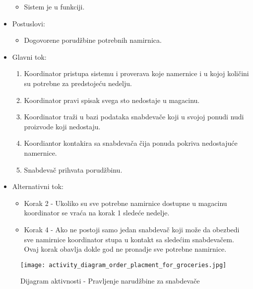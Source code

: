 \begin{itemize}
\begin{itemize}
		    \item Sistem je u funkciji.
		\end{itemize}
	\item Postuslovi:
		\begin{itemize}
			\item Dogovorene porudžbine potrebnih namirnica. 
	\end{itemize}
	\item Glavni tok:
		\begin{enumerate}
            \item	Koordinator pristupa sistemu i proverava koje namernice i u kojoj količini su potrebne za predstojeću nedelju.
           \item Koordinator pravi spisak svega sto nedostaje u magacinu.
            \item Koordinator traži u bazi podataka snabdevače koji u svojoj ponudi nudi proizvode koji nedostaju.
             \item  Koordiantor kontakira sa snabdevača čija ponuda pokriva nedostajuće namernice.
            \item Snabdevač prihvata porudžbinu.
		\end{enumerate}
	\item Alternativni tok:
		\begin{itemize}
		    \item Korak 2 - Ukoliko su sve potrebne namirnice dostupne u magacinu koordinator se vraća na korak 1 sledeće nedelje.
		    \item Korak 4 - Ako ne postoji samo jedan snabdevač koji može da obezbedi sve namirnice koordinator stupa u kontakt sa sledećim snabdevačem. Ovaj korak obavlja dokle god ne pronadje sve potrebne namirnice.
		\end{itemize}
\end{itemize}

\begin{figure}[H]
\begin{center}
\texttt{[image: activity\_diagram\_order\_placment\_for\_groceries.jpg]}
\end{center}
    \caption{Dijagram aktivnosti - Pravljenje narudžbine za snabdevače}
\label{fig:Activity_diagram_order_placment_for_groceries}
\end{figure}
